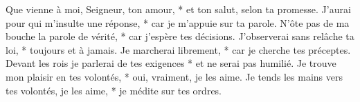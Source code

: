 Que vienne à moi, Seigneur, ton amour, *
et ton salut, selon ta promesse.
\versseparator
J’aurai pour qui m’insulte une réponse, *
car je m’appuie sur ta parole.
\versseparator
N’ôte pas de ma bouche la parole de vérité, *
car j’espère tes décisions.
\versseparator
J’observerai sans relâche ta loi, *
toujours et à jamais.
\versseparator
Je marcherai librement, *
car je cherche tes préceptes.
\versseparator
Devant les rois je parlerai de tes exigences *
et ne serai pas humilié.
\versseparator
Je trouve mon plaisir en tes volontés, *
oui, vraiment, je les aime.
\versseparator
Je tends les mains vers tes volontés, je les aime, *
je médite sur tes ordres.

